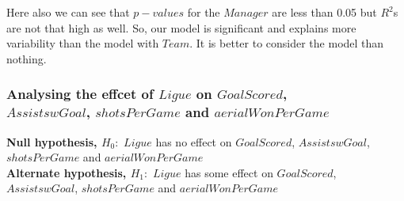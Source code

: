 \documentclass[12pt]{article}
\begin{document}
Here also we can see that $ p-values $ for the $ Manager $ are less than 0.05 but $ R^2 $s are not that high as well. So, our model is significant and explains more variability than the model with $ Team $. It is better to consider the model than nothing.

\newpage

\subsubsection{Analysing the effcet of $ Ligue $ on $ GoalScored $, \\ $ AssistswGoal $, $ shotsPerGame $ and $ aerialWonPerGame $}

\textbf{Null hypothesis, $ H_0: $} $ Ligue $ has no effect on $ GoalScored $, $ AssistswGoal $, $ shotsPerGame $  and $ aerialWonPerGame $\\
\textbf{Alternate hypothesis, $ H_1: $} $ Ligue $ has some effect on $ GoalScored $, $ AssistswGoal $, $ shotsPerGame $ and $ aerialWonPerGame $
	
\end{document}

